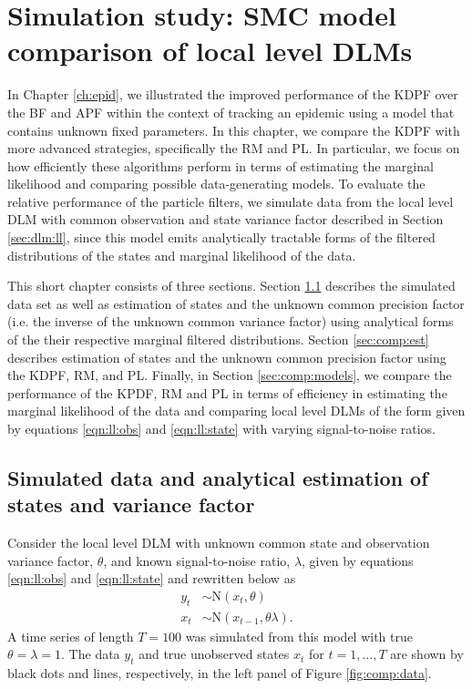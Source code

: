 \chapter{Simulation study: SMC model comparison of local level DLMs \label{ch:comp}}

In Chapter \ref{ch:epid}, we illustrated the improved performance of the KDPF over the BF and APF within the context of tracking an epidemic using a model that contains unknown fixed parameters. In this chapter, we compare the KDPF with more advanced strategies, specifically the RM and PL. In particular, we focus on how efficiently these algorithms perform in terms of estimating the marginal likelihood and comparing possible data-generating models. To evaluate the relative performance of the particle filters, we simulate data from the local level DLM with common observation and state variance factor described in Section \ref{sec:dlm:ll}, since this model emits analytically tractable forms of the filtered distributions of the states and marginal likelihood of the data.

This short chapter consists of three sections. Section \ref{sec:comp:data} describes the simulated data set as well as estimation of states and the unknown common precision factor (i.e. the inverse of the unknown common variance factor) using analytical forms of the their respective marginal filtered distributions. Section \ref{sec:comp:est} describes estimation of states and the unknown common precision factor using the KDPF, RM, and PL. Finally, in Section \ref{sec:comp:models}, we compare the performance of the KPDF, RM and PL in terms of efficiency in estimating the marginal likelihood of the data and comparing local level DLMs of the form given by equations \eqref{eqn:ll:obs} and \eqref{eqn:ll:state} with varying signal-to-noise ratios.

\section{Simulated data and analytical estimation of states and variance factor} \label{sec:comp:data}

Consider the local level DLM with unknown common state and observation variance factor, $\theta$, and known signal-to-noise ratio, $\lambda$, given by equations \eqref{eqn:ll:obs} and \eqref{eqn:ll:state} and rewritten below as
\begin{align*}
y_t &\sim \mbox{N}(x_t, \theta) \\
x_t &\sim \mbox{N}(x_{t-1}, \theta\lambda).
\end{align*}
A time series of length $T = 100$ was simulated from this model with true $\theta = \lambda = 1$. The data $y_t$ and true unobserved states $x_t$ for $t=1,\ldots,T$ are shown by black dots and lines, respectively, in the left panel of Figure \ref{fig:comp:data}.

